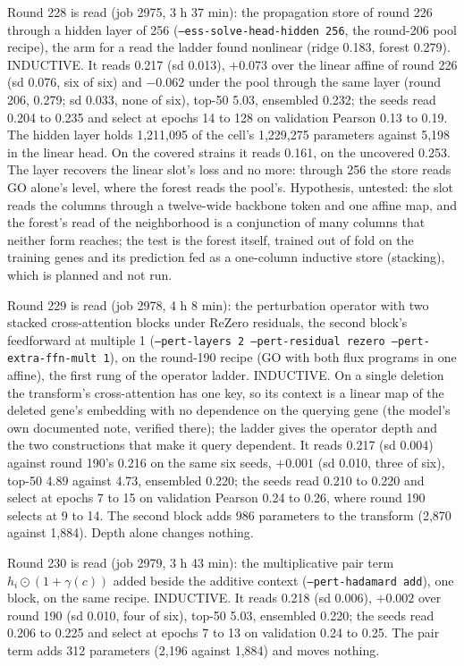 Round 228 is read (job 2975, 3 h 37 min): the propagation store of round 226 through a
hidden layer of 256 (\texttt{--ess-solve-head-hidden 256}, the round-206 pool recipe),
the arm for a read the ladder found nonlinear (ridge 0.183, forest 0.279). INDUCTIVE.
It reads 0.217 (sd 0.013), $+0.073$ over the linear affine of round 226 (sd 0.076, six
of six) and $-0.062$ under the pool through the same layer (round 206, 0.279; sd 0.033,
none of six), top-50 5.03, ensembled 0.232; the seeds read 0.204 to 0.235 and select at
epochs 14 to 128 on validation Pearson 0.13 to 0.19. The hidden layer holds 1,211,095
of the cell's 1,229,275 parameters against 5,198 in the linear head. On the covered
strains it reads 0.161, on the uncovered 0.253. The layer recovers the linear slot's
loss and no more: through 256 the store reads GO alone's level, where the forest reads
the pool's. Hypothesis, untested: the slot reads the columns through a twelve-wide
backbone token and one affine map, and the forest's read of the neighborhood is a
conjunction of many columns that neither form reaches; the test is the forest itself,
trained out of fold on the training genes and its prediction fed as a one-column
inductive store (stacking), which is planned and not run.

Round 229 is read (job 2978, 4 h 8 min): the perturbation operator with two stacked
cross-attention blocks under ReZero residuals, the second block's feedforward at
multiple 1 (\texttt{--pert-layers 2 --pert-residual rezero --pert-extra-ffn-mult 1}),
on the round-190 recipe (GO with both flux programs in one affine), the first rung of
the operator ladder. INDUCTIVE. On a single deletion the transform's cross-attention
has one key, so its context is a linear map of the deleted gene's embedding with no
dependence on the querying gene (the model's own documented note, verified there); the
ladder gives the operator depth and the two constructions that make it query
dependent. It reads 0.217 (sd 0.004) against round 190's 0.216 on the same six seeds,
$+0.001$ (sd 0.010, three of six), top-50 4.89 against 4.73, ensembled 0.220; the seeds
read 0.210 to 0.220 and select at epochs 7 to 15 on validation Pearson 0.24 to 0.26,
where round 190 selects at 9 to 14. The second block adds 986 parameters to the
transform (2,870 against 1,884). Depth alone changes nothing.

Round 230 is read (job 2979, 3 h 43 min): the multiplicative pair term
$h_i \odot (1 + \gamma(c))$ added beside the additive context
(\texttt{--pert-hadamard add}), one block, on the same recipe. INDUCTIVE. It reads
0.218 (sd 0.006), $+0.002$ over round 190 (sd 0.010, four of six), top-50 5.03,
ensembled 0.220; the seeds read 0.206 to 0.225 and select at epochs 7 to 13 on
validation 0.24 to 0.25. The pair term adds 312 parameters (2,196 against 1,884) and
moves nothing.

